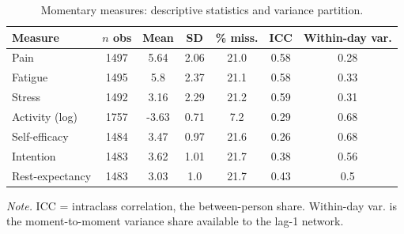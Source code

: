 \begin{table}[H]
\raggedright
\caption{Momentary measures: descriptive statistics and variance partition.}
\label{tab:emadesc}
\footnotesize
\begingroup
\setlength{\tabcolsep}{4pt}
\renewcommand{\arraystretch}{1.08}
\noindent
\begin{tabular*}{\textwidth}{@{\extracolsep{\fill}}lcccccc@{}}
\toprule
Measure & $n$ obs & Mean & SD & \% miss. & ICC & Within-day var. \\
\midrule
Pain & 1497 & 5.64 & 2.06 & 21.0 & 0.58 & 0.28 \\
Fatigue & 1495 & 5.8 & 2.37 & 21.1 & 0.58 & 0.33 \\
Stress & 1492 & 3.16 & 2.29 & 21.2 & 0.59 & 0.31 \\
Activity (log) & 1757 & -3.63 & 0.71 & 7.2 & 0.29 & 0.68 \\
Self-efficacy & 1484 & 3.47 & 0.97 & 21.6 & 0.26 & 0.68 \\
Intention & 1483 & 3.62 & 1.01 & 21.7 & 0.38 & 0.56 \\
Rest-expectancy & 1483 & 3.03 & 1.0 & 21.7 & 0.43 & 0.5 \\
\bottomrule
\end{tabular*}
\par\vspace{3pt}\noindent\parbox{\textwidth}{\footnotesize\textit{Note.} ICC = intraclass correlation, the between-person share. Within-day var. is the moment-to-moment variance share available to the lag-1 network.}
\endgroup
\end{table}
